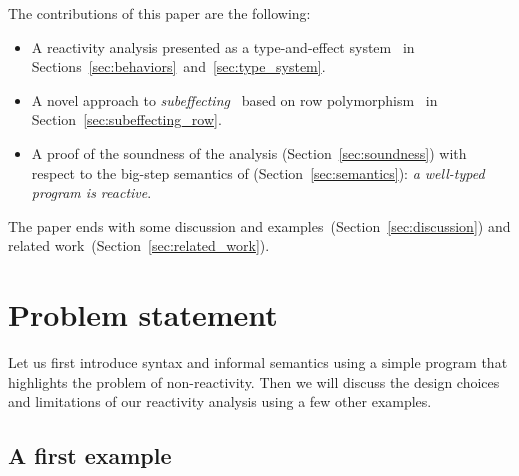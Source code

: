 \documentclass[9pt,preprint]{sigplanconf}
\begin{document}

The contributions of this paper are the following:
\begin{itemize}
\item A reactivity analysis presented as a type-and-effect system~\cite{Lucassen:1988} in Sections~\ref{sec:behaviors}~and~\ref{sec:type_system}.
\item A novel approach to \emph{subeffecting}~\cite{Nielson:1999} based on row polymorphism~\cite{Remy:1993} in Section~\ref{sec:subeffecting_row}.
\item A proof of the soundness of the analysis (Section~\ref{sec:soundness}) with respect to the big-step semantics of \rml (Section~\ref{sec:semantics}): \emph{a well-typed program is reactive}.
\end{itemize}

The paper ends with some discussion and examples~(Section~\ref{sec:discussion}) and related work~(Section~\ref{sec:related_work}).

\clearpage

\section{Problem statement}
\label{sec:problem}

Let us first introduce \rml{} syntax and informal semantics using a simple program that highlights the problem of non-reactivity. Then we will discuss the design choices and limitations of our reactivity analysis using a few other examples.

\subsection{A first example}
\label{sec:first_example}
\end{document}
